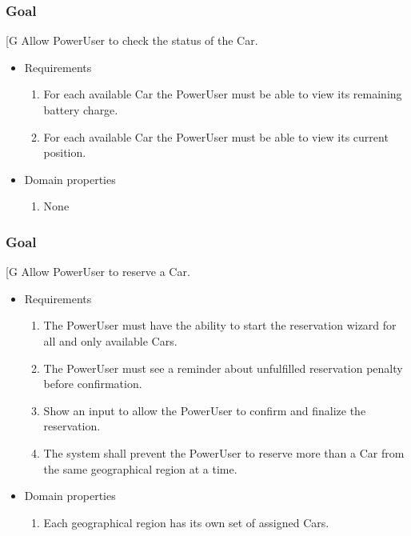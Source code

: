     \subsubsection{Goal }
    {[}G\arabic{goalctr}{]}
    Allow PowerUser to check the status of the Car.
    \begin{itemize}
        \item Requirements
        \begin{enumerate}[REQ]
    		    \item For each available Car the PowerUser must be able to view its remaining battery charge.
			    \item For each available Car the PowerUser must be able to view its current position.
        \end{enumerate}
        \item Domain properties
        \begin{enumerate}[PRO]
    			\item None
        \end{enumerate}
    \end{itemize}

    \subsubsection{Goal }
    {[}G\arabic{goalctr}{]}
    Allow PowerUser to reserve a Car.
    \begin{itemize}
        \item Requirements
        \begin{enumerate}[REQ]
    		    \item The PowerUser must have the ability to start the reservation wizard for all and only available Cars.
			    \item The PowerUser must see a reminder about unfulfilled reservation penalty before confirmation.
			    \item Show an input to allow the PowerUser to confirm and finalize the reservation.
			    \item The system shall prevent the PowerUser to reserve more than a Car from the same geographical region at a time.
        \end{enumerate}
        \item Domain properties
        \begin{enumerate}[PRO]
    			\item Each geographical region has its own set of assigned Cars.
        \end{enumerate}
    \end{itemize}
    
